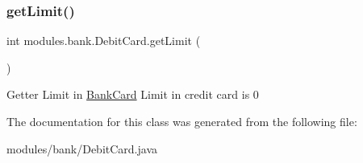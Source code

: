 \subsubsection{\texorpdfstring{get\+Limit()}{getLimit()}}
{\footnotesize\ttfamily int modules.\+bank.\+Debit\+Card.\+get\+Limit (\begin{DoxyParamCaption}{ }\end{DoxyParamCaption})\hspace{0.3cm}{\ttfamily [inline]}}

Getter Limit in \mbox{\hyperlink{classmodules_1_1bank_1_1_bank_card}{Bank\+Card}} Limit in credit card is 0 

The documentation for this class was generated from the following file\+:\begin{DoxyCompactItemize}
\item 
modules/bank/Debit\+Card.\+java\end{DoxyCompactItemize}
